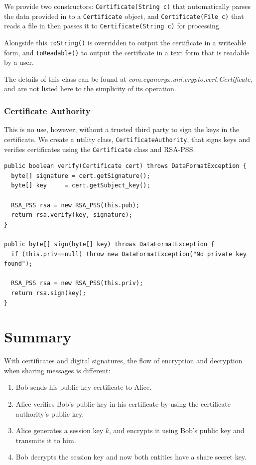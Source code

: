   We provide two constructors: \verb!Certificate(String c)! that automatically parses the data provided in to a \verb!Certificate! object, and \verb!Certificate(File c)! that reads a file in then passes it to \verb!Certificate(String c)! for processing.
  
  Alongside this \verb!toString()! is overridden to output the certificate in a writeable form, and \verb!toReadable()! to output the certificate in a text form that is readable by a user.
  
  The details of this class can be found at \emph{com.cyanoryx.uni.crypto.cert.Certificate}, and are not listed here to the simplicity of its operation.
  
  \subsubsection{Certificate Authority}
  
  This is no use, however, without a trusted third party to sign the keys in the certificate. We create a utility class, \verb!CertificateAuthority!, that signs keys and verifies certificates using the \verb!Certificate! class and RSA-PSS. \\
  
  \begin{lstlisting}
public boolean verify(Certificate cert) throws DataFormatException {
  byte[] signature = cert.getSignature();
  byte[] key     = cert.getSubject_key();
  
  RSA_PSS rsa = new RSA_PSS(this.pub);
  return rsa.verify(key, signature);
}

public byte[] sign(byte[] key) throws DataFormatException {
  if (this.priv==null) throw new DataFormatException("No private key found");
  
  RSA_PSS rsa = new RSA_PSS(this.priv);
  return rsa.sign(key);
}
\end{lstlisting}

\section{Summary}

With certificates and digital signatures, the flow of encryption and decryption when sharing messages is different:

\begin{enumerate}
  \item Bob sends his public-key certificate to Alice.
  \item Alice verifies Bob's public key in his certificate by using the certificate authority's public key.
  \item Alice generates a session key $k$, and encrypts it using Bob's public key and transmits it to him.
  \item Bob decrypts the session key and now both entities have a share secret key.
\end{enumerate}